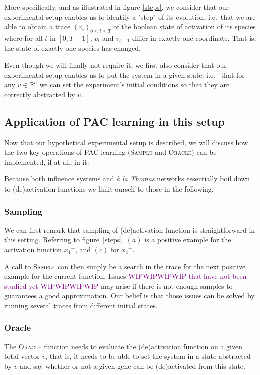 \documentclass{llncs}
\newcommand{\wip}[1]{\textcolor{Purple}{WIPWIPWIPWIP #1 WIPWIPWIPWIP}}
\begin{document}
More specifically, and as illustrated in figure \ref{steps}, we consider that our experimental setup enables us to identify a "step" of its evolution, i.e.~that we are able to obtain a trace $(v_i)_{0 \leq t \leq T}$ of the boolean state of activation of its species where for all $t$ in $[0,T-1]$, $v_t$ and $v_{t+1}$ differ in exactly one coordinate. That is, the state of exactly one species has changed.


Even though we will finally not require it, we first also consider that our experimental setup enables us to put the system in a given state, i.e.~ that for any $v \in \mathbb{B}^n$ we can set the experiment's initial conditions so that they are correctly abstracted by $v$.

\subsection{Application of PAC learning in this setup}
Now that our hypothetical experimental setup is described, we will discuss how the two key operations of PAC-learning (\textsc{Sample} and \textsc{Oracle}) can be implemented, if at all, in it.

Because both influence systems and \textit{\`{a} la Thomas} networks essentially boil down to (de)activation functions we limit ourself to those in the following.

\subsubsection{Sampling}

We can first remark that sampling of (de)activation function is straightforward in this setting. Referring to figure~\ref{steps}, $(a)$ is a positive example for the activation function ${x_1}^+$, and $(c)$ for ${x_4}^-$.

A call to \textsc{Sample} can then simply be a search in the trace for the next positive example for the current function. Issues \wip{that have not been studied yet} may arise if there is not enough samples to guarantees a good approximation. Our belief is that those issues can be solved by running several traces from different initial states.

\subsubsection{Oracle}
The \textsc{Oracle} function needs to evaluate the (de)activation function on a given total vector $v$, that is, it needs to be able to set the system in a state abstracted by $v$ and say whether or not a given gene can be (de)activated from this state.
\end{document}
